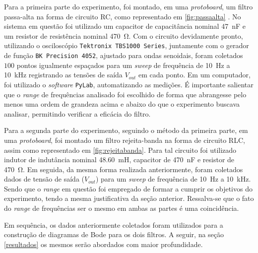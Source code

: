 
Para a primeira parte do experimento, foi montado, em uma \textit{protoboard}, um filtro passa-alta na forma de  circuito RC, como representado em \cref{fig:passaalta} . No sistema em questão foi utilizado um capacitor de capacitância nominal \SI{47}{\nano\farad} e um resistor de resistência nominal \SI{470}{\ohm}. Com o circuito devidamente pronto, utilizando o osciloscópio \texttt{Tektronix TBS1000 Series}, juntamente com o gerador de função \texttt{BK Precision 4052}, ajustado para ondas senoidais, foram coletados $100$ pontos igualmente espaçados para um \textit{sweep} de frequência de \SI{10}{\hertz} a \SI{10}{\kilo\hertz} registrando as tensões de saída $V_{out}$ em cada ponto. Em um computador, foi utilizado o \textit{software} \texttt{PyLab}, automatizando as medições. É importante salientar que o \textit{range} de frequências analisado foi escolhido de forma que abrangesse pelo menos uma ordem de grandeza acima e abaixo do que o experimento buscava analisar, permitindo verificar a eficácia do filtro.
\par
Para a segunda parte do experimento, seguindo o método da primeira parte, em uma \textit{protoboard}, foi montado um filtro rejeita-banda na forma de circuito RLC, assim como representado em \ref{fig:rejeitabanda}. Para tal circuito foi utilizado indutor de indutância nominal \SI{48,60}{\milli\henry}, capacitor de \SI{470}{\nano\farad} e resistor de \SI{470}{\ohm}. Em seguida, da mesma forma realizada anteriormente, foram coletados dados de tensão de saída ($V_{out}$) para um \textit{sweep} de frequência de \SI{10}{\hertz} a \SI{10}{\kilo\hertz}. Sendo que o \textit{range} em questão foi empregado de formar a cumprir os objetivos do experimento, tendo a mesma justificativa da seção anterior. Ressalva-se que o fato do \textit{range} de frequências ser o mesmo em ambas as partes é uma coincidência.

Em sequência, os dados anteriormente coletados foram utilizados para a construção de diagramas de Bode para os dois filtros. A seguir, na seção \ref{resultados} os mesmos serão abordados com maior profundidade.

